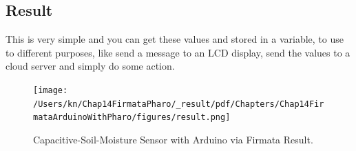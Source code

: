 \documentclass[10pt,twoside,english]{_support/latex/sbabook/sbabook}
\begin{document}
\subsection{Result }
This is very simple and you can get these values and stored in a variable, to use to different purposes, like send a message to an LCD display, send the values to a cloud server and simply do some action.


\begin{figure}

\begin{center}
\texttt{[image: /Users/kn/Chap14FirmataPharo/\_result/pdf/Chapters/Chap14FirmataArduinoWithPharo/figures/result.png]}\caption{Capacitive-Soil-Moisture Sensor with Arduino via Firmata Result.\label{Capacitive-Soil-Moisture Sensor with Arduino via Firmata Result}}\end{center}
\end{figure}







\backmatter

\end{document}
